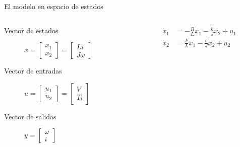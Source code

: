 \documentclass[presentation,aspectratio=169]{beamer}
\begin{document}
\begin{frame}[label={sec:org2e219ef}]{El modelo en espacio de estados}
\begin{columns}
\begin{column}{0.4\columnwidth}
\begin{description}
\item[{Vector de estados}] \(x = \begin{bmatrix} x_1 \\x_2 \end{bmatrix} = \begin{bmatrix} Li \\J\omega \end{bmatrix}\)
\item[{Vector de entradas}] \(u =  \begin{bmatrix} u_1 \\ u_2 \end{bmatrix} = \begin{bmatrix} V\\ T_l \end{bmatrix}\)
\item[{Vector de salidas}] \(y =  \begin{bmatrix}\omega\\ i \end{bmatrix}\)
\end{description}
\end{column}



\begin{column}{0.6\columnwidth}
\begin{align*}
  \dot{x}_1  &= - \frac{R}{L}x_1 - \frac{k}{J}x_2 + u_1\\
  \dot{x}_2  &=  \frac{k}{L}x_1 - \frac{b}{J}x_2 + u_2
\end{align*}


\end{column}
\end{columns}
\end{frame}
\end{document}
